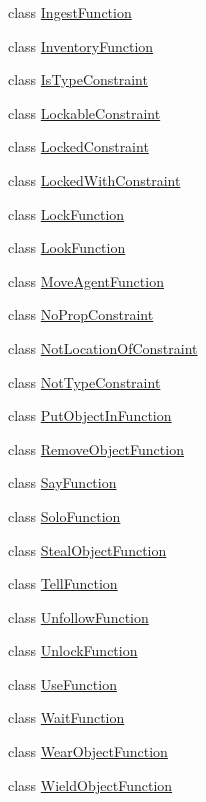 \begin{DoxyCompactItemize}
\item 
class \hyperlink{classlight__chats_1_1graph_1_1IngestFunction}{Ingest\+Function}
\item 
class \hyperlink{classlight__chats_1_1graph_1_1InventoryFunction}{Inventory\+Function}
\item 
class \hyperlink{classlight__chats_1_1graph_1_1IsTypeConstraint}{Is\+Type\+Constraint}
\item 
class \hyperlink{classlight__chats_1_1graph_1_1LockableConstraint}{Lockable\+Constraint}
\item 
class \hyperlink{classlight__chats_1_1graph_1_1LockedConstraint}{Locked\+Constraint}
\item 
class \hyperlink{classlight__chats_1_1graph_1_1LockedWithConstraint}{Locked\+With\+Constraint}
\item 
class \hyperlink{classlight__chats_1_1graph_1_1LockFunction}{Lock\+Function}
\item 
class \hyperlink{classlight__chats_1_1graph_1_1LookFunction}{Look\+Function}
\item 
class \hyperlink{classlight__chats_1_1graph_1_1MoveAgentFunction}{Move\+Agent\+Function}
\item 
class \hyperlink{classlight__chats_1_1graph_1_1NoPropConstraint}{No\+Prop\+Constraint}
\item 
class \hyperlink{classlight__chats_1_1graph_1_1NotLocationOfConstraint}{Not\+Location\+Of\+Constraint}
\item 
class \hyperlink{classlight__chats_1_1graph_1_1NotTypeConstraint}{Not\+Type\+Constraint}
\item 
class \hyperlink{classlight__chats_1_1graph_1_1PutObjectInFunction}{Put\+Object\+In\+Function}
\item 
class \hyperlink{classlight__chats_1_1graph_1_1RemoveObjectFunction}{Remove\+Object\+Function}
\item 
class \hyperlink{classlight__chats_1_1graph_1_1SayFunction}{Say\+Function}
\item 
class \hyperlink{classlight__chats_1_1graph_1_1SoloFunction}{Solo\+Function}
\item 
class \hyperlink{classlight__chats_1_1graph_1_1StealObjectFunction}{Steal\+Object\+Function}
\item 
class \hyperlink{classlight__chats_1_1graph_1_1TellFunction}{Tell\+Function}
\item 
class \hyperlink{classlight__chats_1_1graph_1_1UnfollowFunction}{Unfollow\+Function}
\item 
class \hyperlink{classlight__chats_1_1graph_1_1UnlockFunction}{Unlock\+Function}
\item 
class \hyperlink{classlight__chats_1_1graph_1_1UseFunction}{Use\+Function}
\item 
class \hyperlink{classlight__chats_1_1graph_1_1WaitFunction}{Wait\+Function}
\item 
class \hyperlink{classlight__chats_1_1graph_1_1WearObjectFunction}{Wear\+Object\+Function}
\item 
class \hyperlink{classlight__chats_1_1graph_1_1WieldObjectFunction}{Wield\+Object\+Function}
\end{DoxyCompactItemize}

